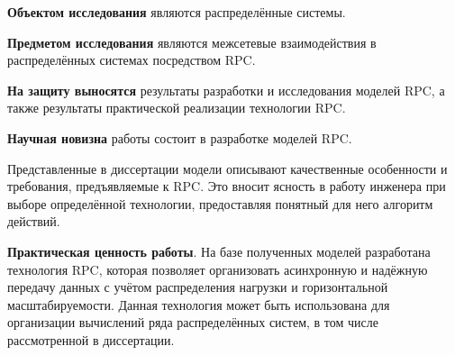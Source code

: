 \textbf{Объектом исследования} являются распределённые системы.

\textbf{Предметом исследования} являются межсетевые взаимодействия в распределённых
системах посредством RPC.

\textbf{На защиту выносятся} результаты разработки и исследования моделей RPC,
а также результаты практической реализации технологии RPC.

\textbf{Научная новизна} работы состоит в разработке моделей RPC.

Представленные в диссертации модели описывают качественные особенности
и требования, предъявляемые к RPC. Это вносит ясность в работу инженера
при выборе определённой технологии, предоставляя понятный для него
алгоритм действий.

\textbf{Практическая ценность работы}. На базе полученных моделей
разработана технология RPC, которая позволяет организовать асинхронную
и надёжную передачу данных с учётом распределения нагрузки и горизонтальной
масштабируемости. Данная технология может быть использована для организации
вычислений ряда распределённых систем, в том числе рассмотренной в диссертации.
